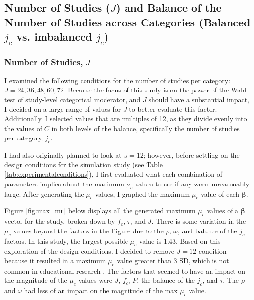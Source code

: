 

\subsection{Number of Studies \texorpdfstring{($J$)}{ } and Balance of the Number of Studies across Categories (Balanced \texorpdfstring{$j_c$}{ } vs. imbalanced \texorpdfstring{$j_c$}{ })}

\subsubsection{Number of Studies, $J$}
I examined the following conditions for the number of studies per category: $J = 24, 36, 48, 60, 72$. Because the focus of this study is on the power of the Wald test of study-level categorical moderator, and $J$ should have a substantial impact, I decided on a large range of values for $J$ to better evaluate this factor. Additionally, I selected values that are multiples of 12, as they divide evenly into the values of $C$ in both levels of the balance, specifically the number of studies per category, $j_c$.  

I had also originally planned to look at $J=12$; however, before settling on the design conditions for the simulation study (see Table \ref{tab:experimentalconditions}), I first evaluated what each combination of parameters implies about the maximum $\mu_c$ values to see if any were unreasonably large. After generating the $\mu_c$ values, I graphed the maximum $\mu_c$ value of each $\bm{\beta}$.

Figure \ref{fig:max_mu} below displays all the generated maximum $\mu_c$ values of a $\bm{\beta}$ vector for the study, broken down by $f_c$, $\tau$, and $J$. There is some variation in the $\mu_c$ values beyond the factors in the Figure due to the $\rho$, $\omega$, and balance of the $j_c$ factors. In this study, the largest possible $\mu_c$ value is 1.43. Based on this exploration of the design conditions, I decided to remove $J=12$ condition because it resulted in a maximum $\mu_c$ value greater than 3 SD, which is not common in educational research \autocite{KraftMatthewA.2020IESo}.  The factors that seemed to have an impact on the magnitude of the $\mu_c$ values were $J$, $f_c$, $P$, the balance of the $j_c$, and $\tau$. The $\rho$ and $\omega$ had less of an impact on the magnitude of the max $\mu_c$ value. 

